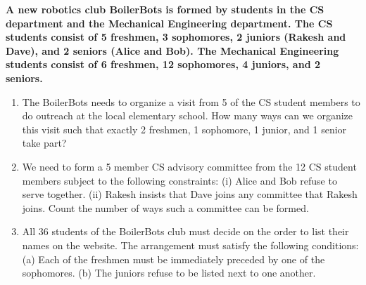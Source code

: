 \documentclass[11pt]{article}
\begin{document}
    \textbf{A new robotics club BoilerBots is formed by students in the CS department and the Mechanical Engineering department. The CS students consist of 5 freshmen, 3 sophomores, 2 juniors (Rakesh and Dave), and 2 seniors (Alice and Bob). The Mechanical Engineering students consist of 6 freshmen, 12 sophomores, 4 juniors, and 2 seniors.}
    \begin{enumerate}[label=(\alph*)]
        \item The BoilerBots needs to organize a visit from 5 of the CS student members to do outreach at the local elementary school. How many ways can we organize this visit such that exactly 2 freshmen, 1 sophomore, 1 junior, and 1 senior take part?
        \item We need to form a 5 member CS advisory committee from the 12 CS student members subject to the following constraints: (i) Alice and Bob refuse to serve together. (ii) Rakesh insists that Dave joins any committee that Rakesh joins. Count the number of ways such a committee can be formed.
        \item All 36 students of the BoilerBots club must decide on the order to list their names on the website. The arrangement must satisfy the following conditions: (a) Each of the freshmen must be immediately preceded by one of the sophomores. (b) The juniors refuse to be listed next to one another.
    \end{enumerate}
\end{document}
